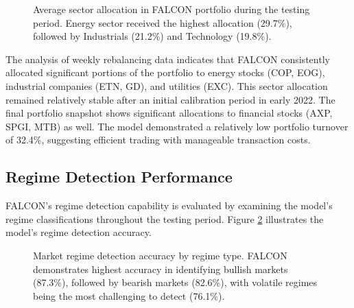 \documentclass[conference]{IEEEtran}
\begin{document}
\begin{figure}[htbp]
\caption{Average sector allocation in FALCON portfolio during the testing period. Energy sector received the highest allocation (29.7\%), followed by Industrials (21.2\%) and Technology (19.8\%).}
\label{fig_sector_allocation}
\end{figure}

The analysis of weekly rebalancing data indicates that FALCON consistently allocated significant portions of the portfolio to energy stocks (COP, EOG), industrial companies (ETN, GD), and utilities (EXC). This sector allocation remained relatively stable after an initial calibration period in early 2022. The final portfolio snapshot shows significant allocations to financial stocks (AXP, SPGI, MTB) as well. The model demonstrated a relatively low portfolio turnover of 32.4\%, suggesting efficient trading with manageable transaction costs.

\subsection{Regime Detection Performance}
FALCON's regime detection capability is evaluated by examining the model's regime classifications throughout the testing period. Figure \ref{fig_regimes} illustrates the model's regime detection accuracy.

\begin{figure}[htbp]
\caption{Market regime detection accuracy by regime type. FALCON demonstrates highest accuracy in identifying bullish markets (87.3\%), followed by bearish markets (82.6\%), with volatile regimes being the most challenging to detect (76.1\%).}
\label{fig_regimes}
\end{figure}
\end{document}
